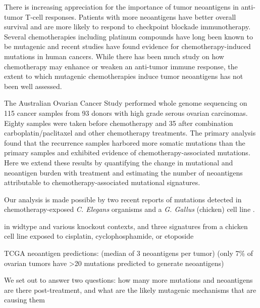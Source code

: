 There is increasing appreciation for the importance of tumor neoantigens in anti-tumor T-cell responses\cite{Schumacher_2015}. Patients with more neoantigens have better overall survival\cite{Brown_2014} and are more likely to respond to checkpoint blockade immunotherapy\cite{Van_Allen_2015,Rizvi_2015}. Several chemotherapies including platinum compounds have long been known to be mutagenic\cite{Hannan_1989} and recent studies have found evidence for chemotherapy-induced mutations in human cancers\cite{Murugaesu_2015,Johnson_2013}. While there has been much study on how chemotherapy may enhance\cite{Hato_2012} or weaken\cite{Litterman_2013} an anti-tumor immune response, the extent to which mutagenic chemotherapies induce tumor neoantigens has not been well assessed.

The Australian Ovarian Cancer Study performed whole genome sequencing on 115 cancer samples from 93 donors with high grade serous ovarian carcinomas\cite{Patch_2015}. Eighty samples were taken before chemotherapy and 35 after combination carboplatin/paclitaxel and other chemotherapy treatments. The primary analysis found that the recurrence samples harbored more somatic mutations than the primary samples and exhibited evidence of chemotherapy-associated mutations. Here we extend these results by quantifying the change in mutational and neoantigen burden with treatment and estimating the number of neoantigens attributable to chemotherapy-associated mutational signatures.

Our analysis is made possible by two recent reports of mutations detected in chemotherapy-exposed \textit{C. Elegans} organisms\cite{Meier_2014} and a \textit{G. Gallus} (chicken) cell line \cite{Szikriszt_2016}.

in widtype and various knockout contexts, and three signatures from a chicken cell line exposed to cisplatin, cyclophosphamide, or etoposide


TCGA neoantigen predictions: \cite{Brown_2014} (median of 3 neoantigens per tumor) \cite{Rooney_2015} (only 7\% of ovarian tumors have >20 mutations predicted to generate neoantigens)


We set out to answer two questions: how many more mutations and neoantigens are there post-treatment, and what are the likely mutagenic mechanisms that are causing them

